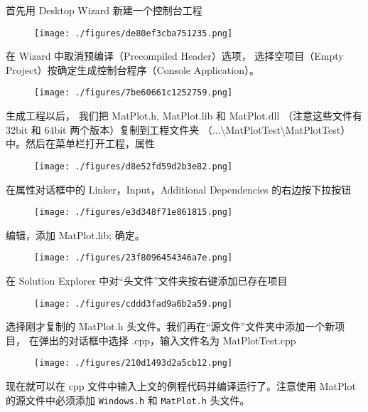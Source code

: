 首先用 Desktop Wizard 新建一个控制台工程
\begin{figure}[ht]
\centering
\texttt{[image: ./figures/de80ef3cba751235.png]}
\caption{} \label{fig_MtPlot_9}
\end{figure}

在 Wizard 中取消预编译（Precompiled Header）选项， 选择空项目（Empty Project）按确定生成控制台程序（Console Application）。

\begin{figure}[ht]
\centering
\texttt{[image: ./figures/7be60661c1252759.png]}
\caption{} \label{fig_MtPlot_10}
\end{figure}

生成工程以后， 我们把 MatPlot.h, MatPlot.lib 和 MatPlot.dll （注意这些文件有 32bit 和 64bit 两个版本）复制到工程文件夹 （...\textbackslash MatPlotTest\textbackslash MatPlotTest）中。然后在菜单栏打开工程，属性

\begin{figure}[ht]
\centering
\texttt{[image: ./figures/d8e52fd59d2b3e82.png]}
\caption{} \label{fig_MtPlot_11}
\end{figure}

在属性对话框中的 Linker，Input，Additional Dependencies 的右边按下拉按钮

\begin{figure}[ht]
\centering
\texttt{[image: ./figures/e3d348f71e861815.png]}
\caption{} \label{fig_MtPlot_12}
\end{figure}

编辑，添加 MatPlot.lib; 确定。

\begin{figure}[ht]
\centering
\texttt{[image: ./figures/23f8096454346a7e.png]}
\caption{} \label{fig_MtPlot_13}
\end{figure}

在 Solution Explorer 中对“头文件”文件夹按右键添加已存在项目

\begin{figure}[ht]
\centering
\texttt{[image: ./figures/cddd3fad9a6b2a59.png]}
\caption{} \label{fig_MtPlot_14}
\end{figure}

选择刚才复制的 MatPlot.h 头文件。我们再在“源文件”文件夹中添加一个新项目， 在弹出的对话框中选择 .cpp，输入文件名为 MatPlotTest.cpp

\begin{figure}[ht]
\centering
\texttt{[image: ./figures/210d1493d2a5cb12.png]}
\caption{} \label{fig_MtPlot_15}
\end{figure}

现在就可以在 cpp 文件中输入上文的例程代码并编译运行了。注意使用 MatPlot 的源文件中必须添加 \verb|Windows.h| 和 \verb|MatPlot.h| 头文件。
